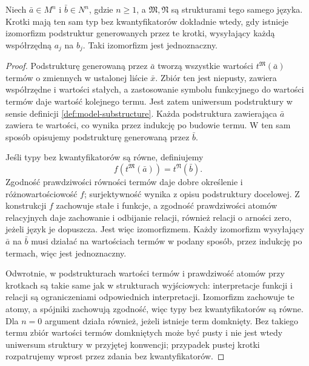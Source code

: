 \begin{lemat}
\label{lem:mod-qe-generated-substructures}
Niech $\bar a\in M^n$ i $\bar b\in N^n$, gdzie $n\geq1$,
a $\mathfrak M,\mathfrak N$ są strukturami tego samego
języka. Krotki mają ten sam typ bez kwantyfikatorów
dokładnie wtedy, gdy istnieje izomorfizm podstruktur
generowanych przez te krotki, wysyłający każdą
współrzędną $a_j$ na $b_j$.
Taki izomorfizm jest jednoznaczny.
\end{lemat}
\begin{proof}
Podstrukturę generowaną przez $\bar a$ tworzą wszystkie
wartości $t^{\mathfrak M}(\bar a)$ termów o zmiennych
w ustalonej liście $\bar x$. Zbiór ten jest niepusty,
zawiera współrzędne i wartości stałych, a zastosowanie
symbolu funkcyjnego do wartości termów daje wartość
kolejnego termu. Jest zatem uniwersum podstruktury
w sensie definicji \ref{def:model-substructure}.
Każda podstruktura zawierająca $\bar a$ zawiera te
wartości, co wynika przez indukcję po budowie termu.
W ten sam sposób opisujemy podstrukturę generowaną
przez $\bar b$.

Jeśli typy bez kwantyfikatorów są równe, definiujemy
\[
f(t^{\mathfrak M}(\bar a))=t^{\mathfrak N}(\bar b).
\]
Zgodność prawdziwości równości termów daje dobre
określenie i różnowartościowość $f$; surjektywność
wynika z opisu podstruktury docelowej.
Z konstrukcji $f$ zachowuje stałe i funkcje, a zgodność
prawdziwości atomów relacyjnych daje zachowanie
i odbijanie relacji, również relacji o arności zero,
jeżeli język je dopuszcza. Jest więc izomorfizmem.
Każdy izomorfizm wysyłający $\bar a$ na $\bar b$ musi
działać na wartościach termów w podany sposób,
przez indukcję po termach, więc jest jednoznaczny.

Odwrotnie, w podstrukturach wartości termów
i prawdziwość atomów przy krotkach są takie same
jak w strukturach wyjściowych: interpretacje funkcji
i relacji są ograniczeniami odpowiednich interpretacji.
Izomorfizm zachowuje te atomy, a spójniki zachowują
zgodność, więc typy bez kwantyfikatorów są równe.
Dla $n=0$ argument działa również, jeżeli istnieje
term domknięty. Bez takiego termu zbiór wartości
termów domkniętych może być pusty i nie jest wtedy
uniwersum struktury w przyjętej konwencji; przypadek
pustej krotki rozpatrujemy wprost przez zdania
bez kwantyfikatorów.
\end{proof}

